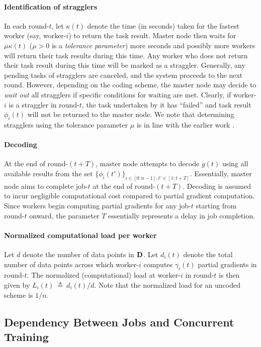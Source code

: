\paragraph{Identification of stragglers} In each round-$t$, let $\kappa(t)$ denote the time (in seconds) taken for the fastest worker (say, worker-$i$) to return the task result. Master node then waits for $\mu\kappa(t)$ ($\mu>0$ is a \textit{tolerance parameter}) more seconds and possibly more workers will return their task results during this time. Any worker who does not return their task result during this time will be marked as a straggler. Generally, any pending tasks of stragglers are canceled, and the system proceeds to the next round. However, depending on the coding scheme, the master node may decide to \textit{wait out} all stragglers if specific conditions for waiting are met. Clearly, if worker-$i$ is a straggler in round-$t$, the task undertaken by it has ``failed'' and task result $\phi_i(t)$ will not be returned to the master node. We note that determining stragglers using the tolerance parameter $\mu$ is in line with the earlier work \cite{seqmatmult}.

\paragraph{Decoding} At the end of round-$(t+T)$, master node attempts to decode $g(t)$ using all available results from the set $\{\phi_i(t')\}_{i\in[0:n-1],t'\in[1:t+T]}$. Essentially, master node aims to complete job-$t$ at the end of round-$(t+T)$. Decoding is assumed to incur negligible computational cost compared to partial gradient computation. Since workers begin computing partial gradients for any job-$t$ starting from round-$t$ onward, the parameter $T$ essentially represents a delay in job completion.

\paragraph{Normalized computational load per worker} Let $d$ denote the number of data points in $\mathbf{D}$. Let $d_i(t)$ denote the total number of data points across which worker-$i$ computes $\gamma_i(t)$ partial gradients in round-$t$. The normalized (computational) load at worker-$i$ in round-$t$ is then given by $L_i(t)~\triangleq~{d_i(t)}/{d}$. Note that the normalized load for an uncoded scheme is $1/n$.


\subsection{Dependency Between Jobs and Concurrent Training}\label{ch2:sec:job_dependency}

